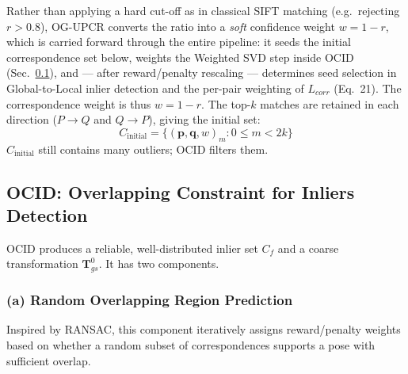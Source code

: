 \documentclass[11pt,a4paper]{article}
\begin{document}
Rather than applying a hard cut-off as in classical SIFT matching (e.g.\ rejecting
$r>0.8$), OG-UPCR converts the ratio into a \emph{soft} confidence weight
$w = 1-r$, which is carried forward through the entire pipeline: it seeds the initial
correspondence set below, weights the Weighted SVD step inside OCID
(Sec.~\ref{sec:ocid}), and — after reward/penalty rescaling — determines seed selection
in Global-to-Local inlier detection and the per-pair weighting of $L_{corr}$
(Eq.~21). The correspondence weight is thus $w = 1 - r$. The top-$k$ matches
are retained in each direction ($P\to Q$ and $Q\to P$), giving the initial set:
\begin{equation}
  C_{\text{initial}} = \{(\mathbf{p}, \mathbf{q}, w)_m : 0 \le m < 2k\}
  \tag{3}
\end{equation}
$C_{\text{initial}}$ still contains many outliers; OCID filters them.

\subsection{OCID: Overlapping Constraint for Inliers Detection}
\label{sec:ocid}

OCID produces a reliable, well-distributed inlier set $C_f$ and a coarse transformation
$\mathbf{T}_{gs}^0$. It has two components.

\subsubsection{(a) Random Overlapping Region Prediction}

Inspired by RANSAC, this component iteratively assigns reward/penalty weights based on
whether a random subset of correspondences supports a pose with sufficient overlap.
\end{document}
